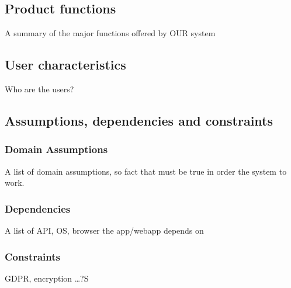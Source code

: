\subsection{Product functions}
A summary of the major functions offered by OUR system

\subsection{User characteristics}
Who are the users?

\subsection{Assumptions, dependencies and constraints}
\subsubsection*{Domain Assumptions}
A list of domain assumptions, so fact that must be true in order the system to work.
\subsubsection*{Dependencies}
A list of API, OS, browser the app/webapp depends on
\subsubsection*{Constraints}
GDPR, encryption \dots?S
